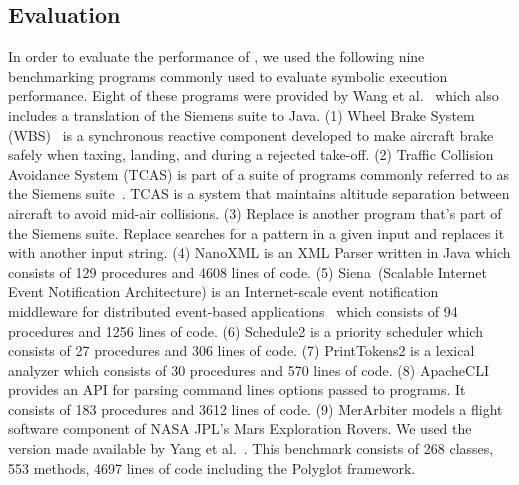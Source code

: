 \subsection{Evaluation}
%
In order to evaluate the performance of \tool, we used the following nine benchmarking programs commonly used to
evaluate symbolic execution performance.
%
Eight of these programs were provided by Wang et al.~\cite{dgse} which also includes a translation of the
Siemens suite to Java.
%
(1) Wheel Brake System (WBS)~\cite{yang2014directed} is a synchronous reactive
component developed to make aircraft brake safely when taxing, landing, and during a rejected take-off.
%
(2) Traffic Collision Avoidance System (TCAS) is part of a suite of programs commonly referred to as the Siemens
suite~\cite{siemens-benchmarks}. TCAS is a system that maintains altitude separation between aircraft to avoid mid-air
collisions.
%
(3) Replace is another program that\rq s part of the Siemens suite. Replace searches for a pattern in a given input and
replaces it with another input string.
%
(4) NanoXML is an XML Parser written in Java which consists of 129 procedures and 4608 lines of code.
%
(5) Siena~(Scalable Internet Event Notification Architecture) is an Internet-scale event notification middleware for
distributed event-based applications~\cite{siena} which consists of 94 procedures and 1256 lines of code.
%
(6) Schedule2 is a priority scheduler which consists of 27 procedures and 306 lines of code.
%
(7) PrintTokens2 is a lexical analyzer which consists of 30 procedures and 570 lines of code.
%
(8) ApacheCLI~\cite{apachecli} provides an API for parsing command lines options passed to programs.
It consists of 183 procedures and 3612 lines of code.
%
(9) MerArbiter models a flight software component of NASA JPL\rq s Mars Exploration Rovers.
%
%
We used the version made
available by Yang et al.~\cite{memoise}. This benchmark consists of 268 classes, 553 methods, 4697 lines of code
including the Polyglot framework.

